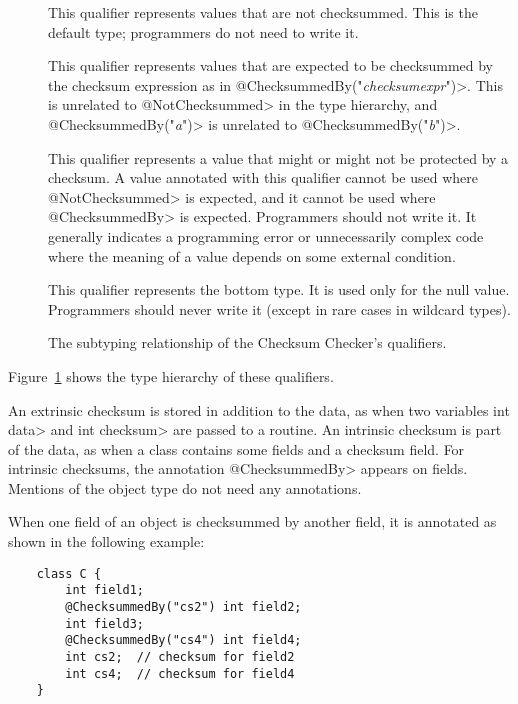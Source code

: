 \begin{description}

    \item[]
    This qualifier represents values that are not checksummed.
    This is the default type;  programmers do not need to write it.

    \item[]
    This qualifier represents values that are expected to be checksummed by
    the checksum expression as in \<@ChecksummedBy{\small("\emph{checksumexpr}")}>.
    This is unrelated to \<@NotChecksummed> in the type hierarchy,
    and \<@ChecksummedBy{\small("\emph{a}")}> is unrelated to
    \<@ChecksummedBy{\small("\emph{b}")}>.

    \item[]
    This qualifier represents a value that might or might not be protected by a checksum.
    A value annotated with this qualifier cannot be used where
    \<@NotChecksummed> is expected, and it cannot be used where
    \<@ChecksummedBy> is expected. Programmers should not write it.
    It generally indicates a programming error or unnecessarily complex code where
    the meaning of a value depends on some external condition.

    \item[]
    This qualifier represents the bottom type. It is used only for the null value.
    Programmers should never write it (except in rare cases in wildcard types).

\end{description}

\begin{figure}
    \caption{The subtyping relationship of the Checksum Checker's qualifiers.}
    \label{fig-checksum-hierarchy}
\end{figure}

Figure~\ref{fig-checksum-hierarchy} shows the type hierarchy of these
qualifiers.

An extrinsic checksum is stored in addition to the data, as when two variables
\<int data> and \<int checksum> are passed to a routine.  An intrinsic checksum is part of the data,
as when a class contains some fields and a checksum field.  For intrinsic checksums, the annotation
\<@ChecksummedBy> appears on fields.  Mentions of the object type do not need any annotations.

When one field of an object is checksummed by another field, it is annotated as shown in the following example:

\begin{Verbatim}
    class C {
        int field1;
        @ChecksummedBy("cs2") int field2;
        int field3;
        @ChecksummedBy("cs4") int field4;
        int cs2;  // checksum for field2
        int cs4;  // checksum for field4
    }
\end{Verbatim}


